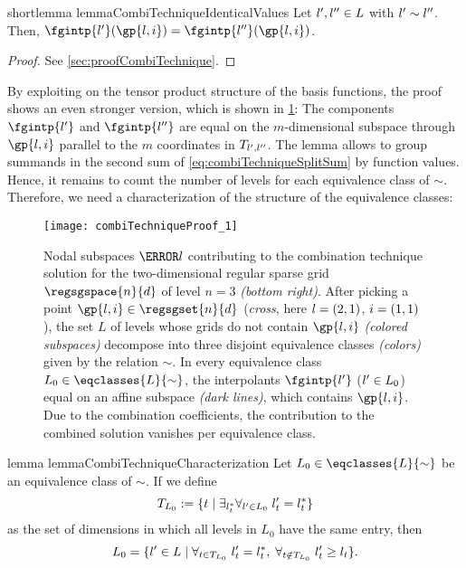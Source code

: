 \begin{restatable}{%
  shortlemma%
}{%
  lemmaCombiTechniqueIdenticalValues%
}
  \label{lemma:combiTechniqueIdenticalValues}
  Let $\*l', \*l'' \in L$ with $\*l' \sim \*l''$.
  Then, $\fgintp{\*l'}(\gp{\*l,\*i})
  = \fgintp{\*l''}(\gp{\*l,\*i})$.
\end{restatable}

\begin{proof}
  See \cref{sec:proofCombiTechnique}.
\end{proof}

By exploiting on the tensor product structure of the basis functions,
the proof shows an even stronger version, which is shown
in \cref{fig:combiTechniqueProof}:
The components $\fgintp{\*l'}$ and $\fgintp{\*l''}$ are equal
on the $m$-dimensional subspace through $\gp{\*l,\*i}$
parallel to the $m$ coordinates in $T_{\*l',\*l''}$.
The lemma allows to group summands in the second sum of
\eqref{eq:combiTechniqueSplitSum} by function values.
Hence, it remains to count the number of levels for
each equivalence class of $\sim$.
Therefore, we need a characterization of the structure
of the equivalence classes:

\begin{SCfigure}
  \texttt{[image: combiTechniqueProof\_1]}%
  \caption[%
    Canceling out function values in the proof of the combination technique%
  ]{%
    Nodal subspaces $\ns{\*l}$ contributing to the combination
    technique solution for the two-dimensional regular sparse grid
    $\regsgspace{n}{d}$ of level $n = 3$ \emph{(bottom right)}.
    After picking a point $\gp{\*l,\*i} \in \regsgset{n}{d}$
    (\emph{cross}, here $\*l = (2, 1)$, $\*i = (1, 1)$),
    the set $L$ of levels whose grids do not contain $\gp{\*l,\*i}$
    \emph{(colored subspaces)}
    decompose into three disjoint equivalence classes
    \emph{(colors)} given by the relation $\sim$.
    In every equivalence class $L_0 \in \eqclasses{L}{\sim}$,
    the interpolants $\fgintp{\*l'}$ ($\*l' \in L_0$)
    equal on an affine subspace
    \emph{(dark lines)}, which contains $\gp{\*l,\*i}$.
    Due to the combination coefficients,
    the contribution to the combined solution
    vanishes per equivalence class.%
  }%
  \label{fig:combiTechniqueProof}%
\end{SCfigure}

\begin{restatable}{%
  lemma%
}{%
  lemmaCombiTechniqueCharacterization%
}
  \label{lemma:combiTechniqueCharacterization}
  Let $L_0 \in \eqclasses{L}{\sim}$ be an equivalence class of $\sim$.
  If we define
  \begin{equation}
    T_{L_0}
    := \{t \mid \exfa{l^\ast_t}{\*l' \in L_0}{l'_t = l^\ast_t}\}
  \end{equation}
  as the set of dimensions in which all levels in $L_0$
  have the same entry, then
  \begin{equation}
    L_0
    = \{\*l' \in L \mid
    \fa{t \in T_{L_0}}{l'_t = l^\ast_t},\;
    \fa{t \notin T_{L_0}}{l'_t \ge l_t}\}.
  \end{equation}
\end{restatable}

